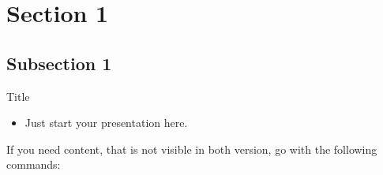 
\begin{frame}
  \tableofcontents
\end{frame}

\section{Section 1}
\subsection{Subsection 1}
\begin{frame}{Title}
  \begin{itemize}
    \item Just start your presentation here.
  \end{itemize}
  
  If you need content, that is not visible in both version, go with the 
  following commands:
  
\end{frame}

